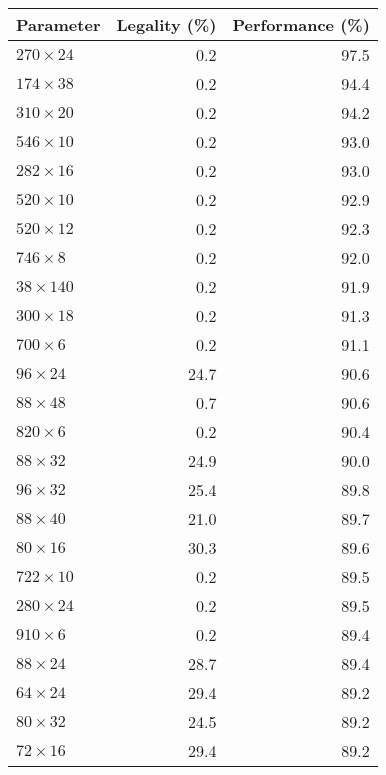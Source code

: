 \begin{tabular}{lrr}
\toprule
       Parameter &  Legality (\%) &  Performance (\%) \\
\midrule
 $270 \times 24$ &            0.2 &              97.5 \\
 $174 \times 38$ &            0.2 &              94.4 \\
 $310 \times 20$ &            0.2 &              94.2 \\
 $546 \times 10$ &            0.2 &              93.0 \\
 $282 \times 16$ &            0.2 &              93.0 \\
 $520 \times 10$ &            0.2 &              92.9 \\
 $520 \times 12$ &            0.2 &              92.3 \\
  $746 \times 8$ &            0.2 &              92.0 \\
 $38 \times 140$ &            0.2 &              91.9 \\
 $300 \times 18$ &            0.2 &              91.3 \\
  $700 \times 6$ &            0.2 &              91.1 \\
  $96 \times 24$ &           24.7 &              90.6 \\
  $88 \times 48$ &            0.7 &              90.6 \\
  $820 \times 6$ &            0.2 &              90.4 \\
  $88 \times 32$ &           24.9 &              90.0 \\
  $96 \times 32$ &           25.4 &              89.8 \\
  $88 \times 40$ &           21.0 &              89.7 \\
  $80 \times 16$ &           30.3 &              89.6 \\
 $722 \times 10$ &            0.2 &              89.5 \\
 $280 \times 24$ &            0.2 &              89.5 \\
  $910 \times 6$ &            0.2 &              89.4 \\
  $88 \times 24$ &           28.7 &              89.4 \\
  $64 \times 24$ &           29.4 &              89.2 \\
  $80 \times 32$ &           24.5 &              89.2 \\
  $72 \times 16$ &           29.4 &              89.2 \\
\bottomrule
\end{tabular}

